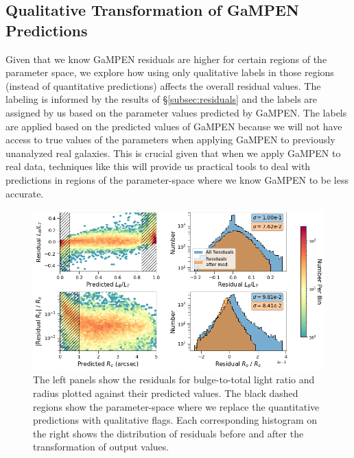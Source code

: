 \documentclass[twocolumn]{aastex63}
\newcommand\gampen{GaMPEN}
\begin{document}
\begin{CJK*}{UTF8}{gbsn}
\subsection{Qualitative Transformation of \gampen{} Predictions} \label{subsec:cuts}

Given that we know \gampen{} residuals are higher for certain regions of the parameter space, we explore how using only qualitative labels in those regions (instead of quantitative predictions) affects the overall residual values. The labeling is informed by the results of \S \ref{subsec:residuals} and the labels are assigned by us based on the parameter values predicted by \gampen{}.
The labels are applied based on the predicted values of \gampen{} because we will not have access to true values of the parameters when applying \gampen{} to previously unanalyzed real galaxies. This is crucial given that when we apply \gampen{} to real data, techniques like this will provide us practical tools to deal with predictions in regions of the parameter-space where we know \gampen{} to be less accurate. 

\begin{figure}[htb]
    \centering
    \includegraphics[width
    =\textwidth]{exclude_zones.png}
    \caption{The left panels show the residuals for bulge-to-total light ratio and radius plotted against their predicted values. The black dashed regions show the parameter-space where we replace the quantitative predictions with qualitative flags. Each corresponding histogram on the right shows the distribution of residuals before and after the transformation of output values.}
    \label{fig:exclude_zones}
\end{figure}


\end{CJK*}
\end{document}

